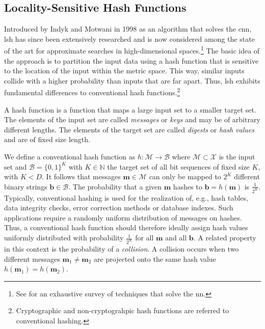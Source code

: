 \documentclass[../../../main.tex]{subfiles}
\begin{document}
\subsection{Locality-Sensitive Hash Functions} \label{subsec:locality-sensitive-hashes}

Introduced by Indyk and Motwani in 1998 \cite{indyk_approximate_1998} as an algorithm that solves the \gls{cnn}, \gls{lsh} has since been extensively researched and is now considered among the state of the art for approximate searches in high-dimensional spaces.\footnote{See \cite{nagarkar2021exploring} for an exhaustive survey of techniques that solve the \gls{nn}.} The basic idea of the approach is to partition the input data using a hash function that is sensitive to the location of the input within the metric space. This way, similar inputs collide with a higher probability than inputs that are far apart. Thus, \gls{lsh} exhibits fundamental differences to conventional hash functions.\footnote{Cryptographic and non-cryptograhpic hash functions are referred to conventional hashing.}

A hash function is a function that maps a large input set to a smaller target set. The elements of the input set are called \textit{messages} or \textit{keys} and may be of arbitrary different lengths. The elements of the target set are called \textit{digests} or \textit{hash values} and are of fixed size length. 

We define a conventional hash function as $h: \mathcal{M} \rightarrow \mathcal{B}$ where $\mathcal{M} \subset \mathcal{X}$ is the input set and $\mathcal{B}=\{0, 1\}^K$ with $K \in \mathbb{N}$ the target set of all bit sequences of fixed size $K$, with $K < D$. It follows that messages $\bm{m} \in \mathcal{M}$ can only be mapped to $2^K$ different binary strings $\bm{b} \in \mathcal{B}$. The probability that a given $\bm{m}$ hashes to $\bm{b} = h(\bm{m})$ is $\frac{1}{2^K}$. Typically, conventional hashing is used for the realization of, e.g., hash tables, data integrity checks, error correction methods or database indexes. Such applications require a randomly uniform distribution of messages on hashes. Thus, a conventional hash function should therefore ideally assign hash values uniformly distributed with probability $\frac{1}{2^K}$ for all $\bm{m}$ and all $\bm{b}$. A related property in this context is the probability of a \textit{collision}. A collision occurs when two different messages $\bm{m}_1 \neq \bm{m}_2$ are projected onto the same hash value $h(\bm{m}_1) = h(\bm{m}_2)$. 
\end{document}
